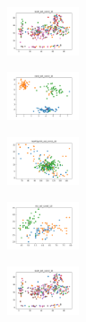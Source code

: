 \begin{figure}[H]
    \begin{subfigure}
        \centering
        \includegraphics[width=0.234\textwidth]{img/ageun/ecoli_set_const_10_277451237_clust.png}
    \end{subfigure}
    \hfill
    \begin{subfigure}
        \centering
        \includegraphics[width=0.234\textwidth]{img/ageun/rand_set_const_10_277451237_clust.png}
    \end{subfigure}
    \hfill
    \begin{subfigure}
        \centering
        \includegraphics[width=0.234\textwidth]{img/ageun/newthyroid_set_const_10_277451237_clust.png}
    \end{subfigure}
    \hfill
    \begin{subfigure}
        \centering
        \includegraphics[width=0.234\textwidth]{img/ageun/iris_set_const_10_49258669_clust.png}
    \end{subfigure}
    \hfill
    \begin{subfigure}
        \centering
        \includegraphics[width=0.234\textwidth]{img/ageun/ecoli_set_const_10_49258669_clust.png}
    \end{subfigure}
    \hfill
    \begin{subfigure}
        \centering

\end{subfigure}
\end{figure}
